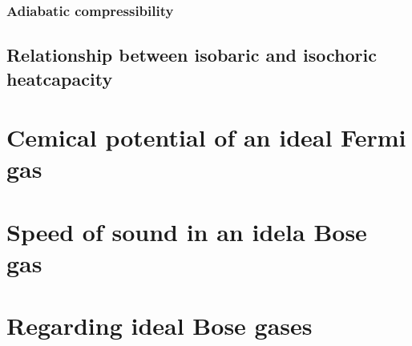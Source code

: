 \documentclass[11pt,letter, swedish, english
]{article}
\begin{document}
\subsubsection{Adiabatic compressibility}


\subsection{Relationship between isobaric and isochoric heatcapacity}




\section{Cemical potential of an ideal Fermi gas}



\section{Speed of sound in an idela Bose gas}



\section{Regarding ideal Bose gases }
\end{document}
